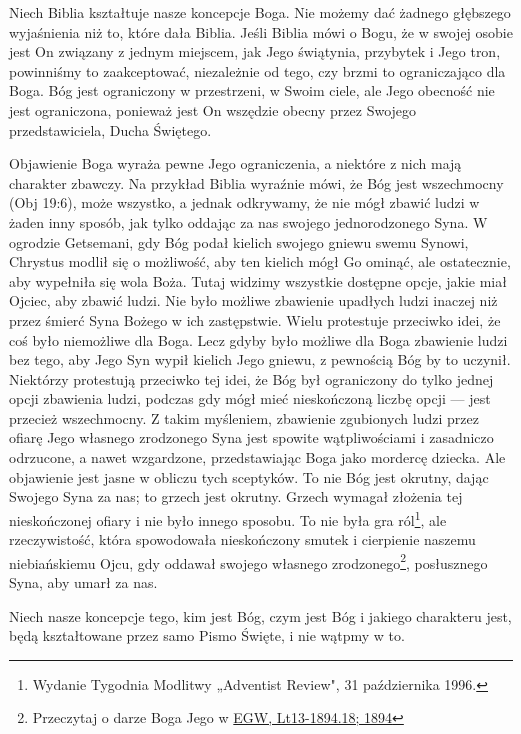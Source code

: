 Niech Biblia kształtuje nasze koncepcje Boga. Nie możemy dać żadnego głębszego wyjaśnienia  niż to, które dała Biblia. Jeśli Biblia mówi o Bogu, że w swojej osobie jest On związany z jednym miejscem, jak Jego świątynia, przybytek i Jego tron, powinniśmy to zaakceptować, niezależnie od tego, czy brzmi to ograniczająco dla Boga. Bóg jest ograniczony w przestrzeni, w Swoim ciele, ale Jego obecność nie jest ograniczona, ponieważ jest On wszędzie obecny przez Swojego przedstawiciela, Ducha Świętego.

Objawienie Boga wyraża pewne Jego ograniczenia, a niektóre z nich mają charakter zbawczy. Na przykład Biblia wyraźnie mówi, że Bóg jest wszechmocny (Obj 19:6), może wszystko, a jednak odkrywamy, że nie mógł zbawić ludzi w żaden inny sposób, jak tylko oddając za nas swojego jednorodzonego Syna. W ogrodzie Getsemani, gdy Bóg podał kielich swojego gniewu swemu Synowi, Chrystus modlił się o możliwość, aby ten kielich mógł Go ominąć, ale ostatecznie, aby wypełniła się wola Boża. Tutaj widzimy wszystkie dostępne opcje, jakie miał Ojciec, aby zbawić ludzi. Nie było możliwe zbawienie upadłych ludzi inaczej niż przez śmierć Syna Bożego w ich zastępstwie. Wielu protestuje przeciwko idei, że coś było niemożliwe dla Boga. Lecz gdyby było możliwe dla Boga zbawienie ludzi bez tego, aby Jego Syn wypił kielich Jego gniewu, z pewnością Bóg by to uczynił. Niektórzy protestują przeciwko tej idei, że Bóg był ograniczony do tylko jednej opcji zbawienia ludzi, podczas gdy mógł mieć nieskończoną liczbę opcji — jest przecież wszechmocny. Z takim myśleniem, zbawienie zgubionych ludzi przez ofiarę Jego własnego zrodzonego Syna jest spowite wątpliwościami i zasadniczo odrzucone, a nawet wzgardzone, przedstawiając Boga jako mordercę dziecka. Ale objawienie jest jasne w obliczu tych sceptyków. To nie Bóg jest okrutny, dając Swojego Syna za nas; to grzech jest okrutny. Grzech wymagał złożenia tej nieskończonej ofiary i nie było innego sposobu. To nie była gra ról\footnote{Wydanie Tygodnia Modlitwy „Adventist Review", 31 października 1996.}, ale rzeczywistość, która spowodowała nieskończony smutek i cierpienie naszemu niebiańskiemu Ojcu, gdy oddawał swojego własnego zrodzonego\footnote{Przeczytaj o darze Boga Jego  w \href{https://egwwritings.org/?ref=en_Lt13-1894.18&para=5486.24}{{EGW, Lt13-1894.18; 1894}}}, posłusznego Syna, aby umarł za nas.

Niech nasze koncepcje tego, kim jest Bóg, czym jest Bóg i jakiego charakteru jest, będą kształtowane przez samo Pismo Święte, i nie wątpmy w to.


